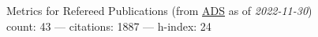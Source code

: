 Metrics for Refereed Publications (from \href{\adsurl}{ADS} as of \textit{2022-11-30}) \\count: 43 --- citations: 1887 --- h-index: 24